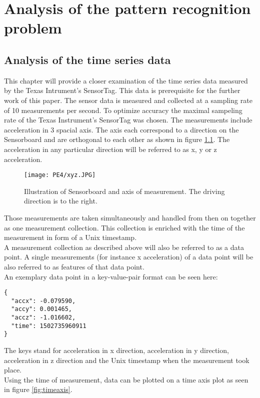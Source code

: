 \chapter{Analysis of the pattern recognition problem}
\label{ch:Analysis of the pattern recognition problem}

\section{Analysis of the time series data}
\label{sec:Analysis of the time series data}
This chapter will provide a closer examination of the time series data measured by the Texas Intrument's SensorTag. This data is prerequisite for the further work of this paper. \newline
The sensor data is measured and collected at a sampling rate of 10 measurements per second. To optimize accuracy the maximal sampeling rate of the Texas Instrument's SensorTag was chosen.  The measurements include acceleration in 3 spacial axis. The axis each correspond to a direction on the Sensorboard and are orthogonal to each other as shown in figure \ref{fig:xyzboard}. The acceleration in any particular direction will be referred to as x, y or z acceleration.

\begin{figure}[h]
\centering
\texttt{[image: PE4/xyz.JPG]}
\caption{Illustration of Sensorboard and axis of measurement. The driving direction is to the right.}
\label{fig:xyzboard}
\end{figure}


Those measurements are taken  simultaneously and handled from then on together as one measurement collection. This collection is enriched with the time of the measurement  in form of a Unix timestamp.\\
A measurement collection as described above will also be referred to as a data point. A single measurements (for instance x acceleration) of a data point will be also referred to as features of that data point.\\
An exemplary data point in a key-value-pair format can be seen here:

\begin{lstlisting}
{
  "accx": -0.079590,
  "accy": 0.001465,
  "accz": -1.016602,
  "time": 1502735960911
}
\end{lstlisting}

The keys stand for acceleration in x direction, acceleration in y direction, acceleration in z direction and the Unix timestamp when the measurement took place. \\
Using the time of measurement, data can be plotted on a time axis plot as seen in figure \ref{fig:timeaxis}.

